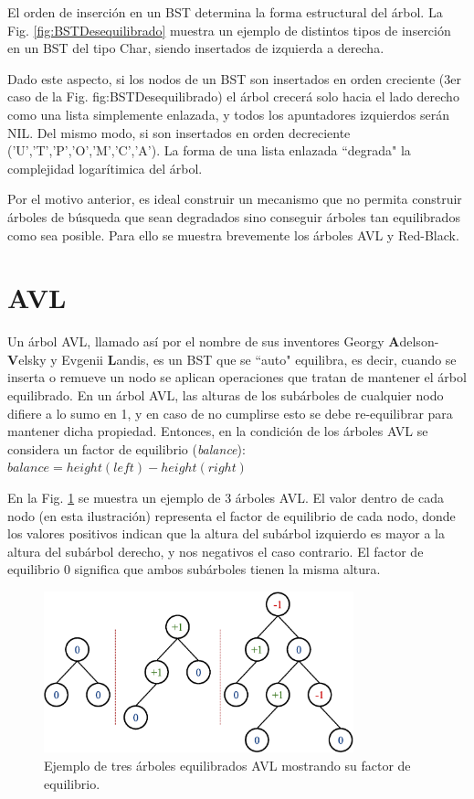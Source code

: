 El orden de inserción en un BST determina la forma estructural del árbol. La Fig. \ref{fig:BSTDesequilibrado} muestra un ejemplo de distintos tipos de inserción en un BST del tipo Char, siendo insertados de izquierda a derecha.

Dado este aspecto, si los nodos de un BST son insertados en orden creciente (3er caso de la Fig. {fig:BSTDesequilibrado}) el árbol crecerá solo hacia el lado derecho como una lista simplemente enlazada, y todos los apuntadores izquierdos serán NIL. Del mismo modo, si son insertados en orden decreciente ('U','T','P','O','M','C','A'). La forma de una lista enlazada ``degrada" la complejidad logarítimica del árbol.

Por el motivo anterior, es ideal construir un mecanismo que no permita construir árboles de búsqueda que sean degradados sino conseguir árboles tan equilibrados como sea posible. Para ello se muestra brevemente los árboles AVL y Red-Black.

\section{AVL}

Un árbol AVL, llamado así por el nombre de sus inventores Georgy \textbf{A}delson-\textbf{V}elsky y Evgenii \textbf{L}andis, es un BST que se ``auto" equilibra, es decir, cuando se inserta o remueve un nodo se aplican operaciones que tratan de mantener el árbol equilibrado. En un árbol AVL, las alturas de los subárboles de cualquier nodo difiere a lo sumo en 1, y en caso de no cumplirse esto se debe re-equilibrar para mantener dicha propiedad. Entonces, en la condición de los árboles AVL se considera un factor de equilibrio (\textit{balance}):
$balance = height(left) - height(right)$

En la Fig. \ref{fig:AVLExample1} se muestra un ejemplo de 3 árboles AVL. El valor dentro de cada nodo (en esta ilustración) representa el factor de equilibrio de cada nodo, donde los valores positivos indican que la altura del subárbol izquierdo es mayor a la altura del subárbol derecho, y nos negativos el caso contrario. El factor de equilibrio 0 significa que ambos subárboles tienen la misma altura. 

\begin{figure}[htpb!]
  \begin{center}
    \includegraphics[width=0.8\textwidth]{images/AVLExample1.eps}
  \end{center}
  \caption{Ejemplo de tres árboles equilibrados AVL mostrando su factor de equilibrio.}
  \label{fig:AVLExample1}
\end{figure}

